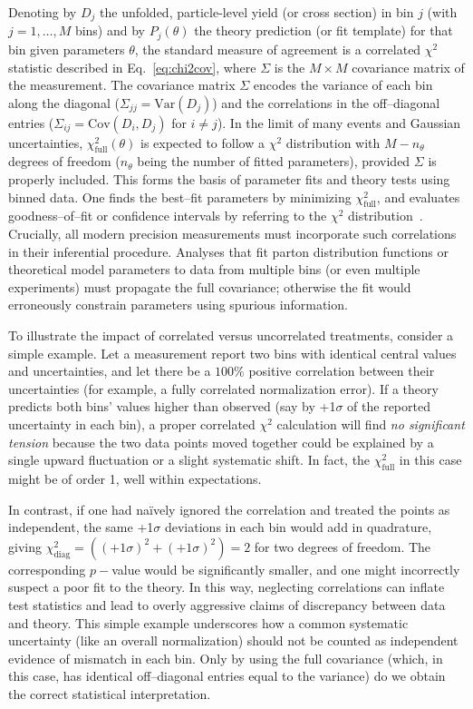     Denoting by $D_j$ the unfolded, particle-level yield (or cross section) in bin $j$ (with $j=1,\dots,M$ bins) and by $P_j(\theta)$ the theory prediction (or fit template) for that bin given parameters $\theta$, the standard measure of agreement is a correlated $\chi^2$ statistic described in Eq.~\ref{eq:chi2cov},
    where $\Sigma$ is the $M\times M$ covariance matrix of the measurement.
    The covariance matrix $\Sigma$ encodes the variance of each bin along the diagonal ($\Sigma_{jj} = \mathrm{Var}(D_j)$) and the correlations in the off--diagonal entries ($\Sigma_{ij} = \mathrm{Cov}(D_i, D_j)$ for $i\neq j$).
    In the limit of many events and Gaussian uncertainties, $\chi^2_{\text{full}}(\theta)$ is expected to follow a $\chi^2$ distribution with $M - n_{\theta}$ degrees of freedom ($n_{\theta}$ being the number of fitted parameters), provided $\Sigma$ is properly included.
    This forms the basis of parameter fits and theory tests using binned data.
    One finds the best--fit parameters by minimizing $\chi^2_{\text{full}}$, and evaluates goodness--of--fit or confidence intervals by referring to the $\chi^2$ distribution~.
    Crucially, all modern precision measurements must incorporate such correlations in their inferential procedure.
    Analyses that fit parton distribution functions or theoretical model parameters to data from multiple bins (or even multiple experiments) must propagate the full covariance; otherwise the fit would erroneously constrain parameters using spurious information.

    To illustrate the impact of correlated versus uncorrelated treatments, consider a simple example.
    Let a measurement report two bins with identical central values and uncertainties, and let there be a $100\%$ positive correlation between their uncertainties (for example, a fully correlated normalization error).
    If a theory predicts both bins' values higher than observed (say by +1$\sigma$ of the reported uncertainty in each bin), a proper correlated $\chi^2$ calculation will find \emph{no significant tension} because the two data points moved together could be explained by a single upward fluctuation or a slight systematic shift.
    In fact, the $\chi^2_{\text{full}}$ in this case might be of order 1, well within expectations.
    
    In contrast, if one had naïvely ignored the correlation and treated the points as independent, the same +1$\sigma$ deviations in each bin would add in quadrature, giving $\chi^2_{\text{diag}} = ((+1\sigma)^2 + (+1\sigma)^2) = 2$ for two degrees of freedom.
    The corresponding $p-$value would be significantly smaller, and one might incorrectly suspect a poor fit to the theory.
    In this way, neglecting correlations can inflate test statistics and lead to overly aggressive claims of discrepancy between data and theory.
    This simple example underscores how a common systematic uncertainty (like an overall normalization) should not be counted as independent evidence of mismatch in each bin. Only by using the full covariance (which, in this case, has identical off--diagonal entries equal to the variance) do we obtain the correct statistical interpretation.


